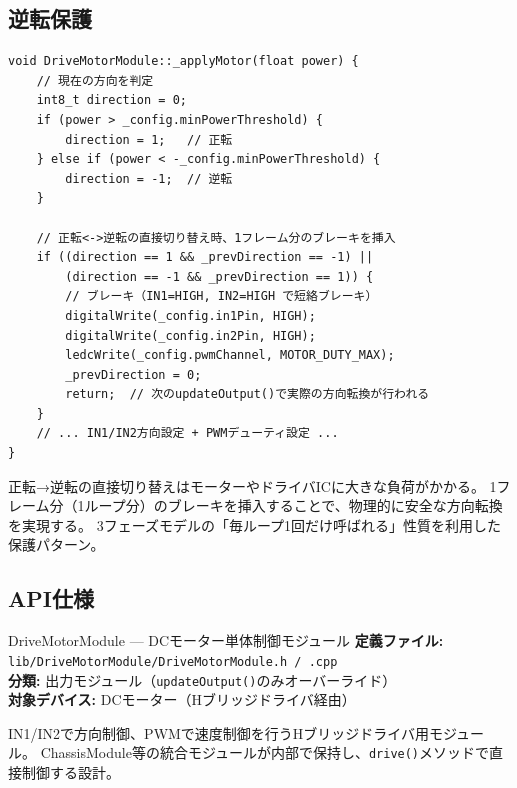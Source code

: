 \subsection{逆転保護}

\begin{lstlisting}[style=cppstyle, caption={DriveMotorModule.cpp — 逆転保護}]
void DriveMotorModule::_applyMotor(float power) {
    // 現在の方向を判定
    int8_t direction = 0;
    if (power > _config.minPowerThreshold) {
        direction = 1;   // 正転
    } else if (power < -_config.minPowerThreshold) {
        direction = -1;  // 逆転
    }

    // 正転<->逆転の直接切り替え時、1フレーム分のブレーキを挿入
    if ((direction == 1 && _prevDirection == -1) ||
        (direction == -1 && _prevDirection == 1)) {
        // ブレーキ（IN1=HIGH, IN2=HIGH で短絡ブレーキ）
        digitalWrite(_config.in1Pin, HIGH);
        digitalWrite(_config.in2Pin, HIGH);
        ledcWrite(_config.pwmChannel, MOTOR_DUTY_MAX);
        _prevDirection = 0;
        return;  // 次のupdateOutput()で実際の方向転換が行われる
    }
    // ... IN1/IN2方向設定 + PWMデューティ設定 ...
}
\end{lstlisting}

\begin{pointbox}[1フレーム遅延によるモーター保護]
正転→逆転の直接切り替えはモーターやドライバICに大きな負荷がかかる。
1フレーム分（1ループ分）のブレーキを挿入することで、物理的に安全な方向転換を実現する。
3フェーズモデルの「毎ループ1回だけ呼ばれる」性質を利用した保護パターン。
\end{pointbox}

\subsection{API仕様}


\begin{apibox}{DriveMotorModule --- DCモーター単体制御モジュール}
\textbf{定義ファイル:} \texttt{lib/DriveMotorModule/DriveMotorModule.h / .cpp}\\
\textbf{分類:} 出力モジュール（\texttt{updateOutput()}のみオーバーライド）\\
\textbf{対象デバイス:} DCモーター（Hブリッジドライバ経由）

IN1/IN2で方向制御、PWMで速度制御を行うHブリッジドライバ用モジュール。
ChassisModule等の統合モジュールが内部で保持し、\texttt{drive()}メソッドで直接制御する設計。
\end{apibox}

